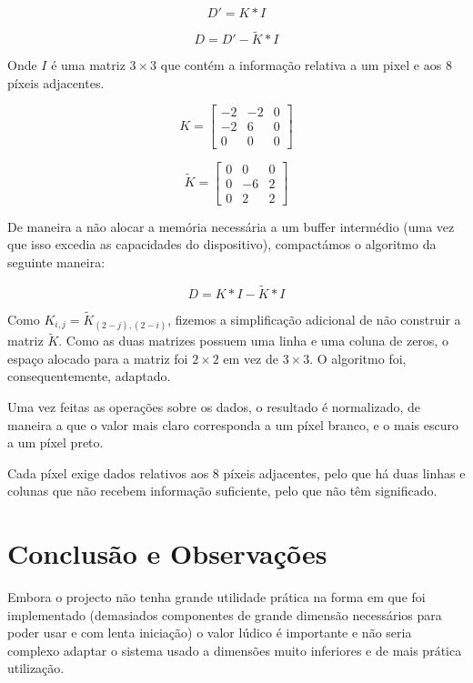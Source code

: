 \documentclass[a4paper]{article}
\begin{document}
\[
D' = K \ast I
\]

\[
D = D' - \widetilde{K} \ast I
\]

Onde $I$ é uma matriz $3 \times 3$ que contém a informação relativa a um pixel e aos 8 píxeis adjacentes.

\[ K =
\begin{bmatrix}
-2 & -2 & 0\\
-2 & 6 & 0\\
0 & 0 & 0
\end{bmatrix}
\]

\[\widetilde{K} = 
\begin{bmatrix}
0&0&0\\
0&-6&2\\
0&2&2
\end{bmatrix}
\]

De maneira a não alocar a memória necessária a um buffer intermédio (uma vez que isso excedia as capacidades do dispositivo), compactámos o algoritmo da seguinte maneira:

\[
D = K \ast I - \widetilde{K} \ast I
\]

Como $K_{i,j} = \widetilde{K}_{(2-j),(2-i)}$, fizemos a simplificação adicional de não construir a matriz $\widetilde{K}$. Como as duas matrizes possuem uma linha e uma coluna de zeros, o espaço alocado para a matriz foi $2\times2$ em vez de $3\times3$. O algoritmo foi, consequentemente, adaptado.

Uma vez feitas as operações sobre os dados, o resultado é normalizado, de maneira a que o valor mais claro corresponda a um píxel branco, e o mais escuro a um píxel preto.

Cada píxel exige dados relativos aos 8 píxeis adjacentes, pelo que há duas linhas e colunas que não recebem informação suficiente, pelo que não têm significado.





\section{Conclusão e Observações}
Embora o projecto não tenha grande utilidade prática na forma em que foi implementado (demasiados componentes de grande dimensão necessários para poder usar e com lenta iniciação) o valor lúdico é importante e não seria complexo adaptar o sistema usado a dimensões muito inferiores e de mais prática utilização. 
\end{document}
